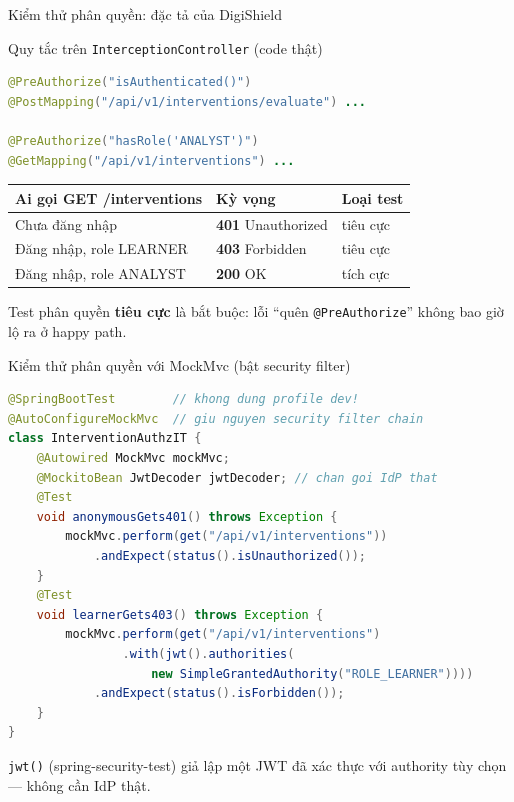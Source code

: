 \documentclass[aspectratio=169,12pt]{beamer}
\begin{document}
\begin{frame}[fragile]{Kiểm thử phân quyền: đặc tả của DigiShield}
  \begin{block}{Quy tắc trên \texttt{InterceptionController} (code thật)}
\begin{lstlisting}[language=Java,style=code]
@PreAuthorize("isAuthenticated()")
@PostMapping("/api/v1/interventions/evaluate") ...

@PreAuthorize("hasRole('ANALYST')")
@GetMapping("/api/v1/interventions") ...
\end{lstlisting}
  \end{block}
  \begin{center}
  \small
  \begin{tabular}{p{4.6cm}p{3.2cm}p{2.6cm}}
    \toprule
    \textbf{Ai gọi GET /interventions} & \textbf{Kỳ vọng} & \textbf{Loại test} \\
    \midrule
    Chưa đăng nhập      & \textbf{401} Unauthorized & tiêu cực \\
    Đăng nhập, role LEARNER & \textbf{403} Forbidden & tiêu cực \\
    Đăng nhập, role ANALYST & \textbf{200} OK        & tích cực \\
    \bottomrule
  \end{tabular}
  \end{center}
  \small Test phân quyền \textbf{tiêu cực} là bắt buộc: lỗi ``quên
  \texttt{@PreAuthorize}'' không bao giờ lộ ra ở happy path.
\end{frame}

\begin{frame}[fragile]{Kiểm thử phân quyền với MockMvc (bật security filter)}
\begin{lstlisting}[language=Java,style=codesm,basicstyle=\ttfamily\scriptsize]
@SpringBootTest        // khong dung profile dev!
@AutoConfigureMockMvc  // giu nguyen security filter chain
class InterventionAuthzIT {
    @Autowired MockMvc mockMvc;
    @MockitoBean JwtDecoder jwtDecoder; // chan goi IdP that
    @Test
    void anonymousGets401() throws Exception {
        mockMvc.perform(get("/api/v1/interventions"))
            .andExpect(status().isUnauthorized());
    }
    @Test
    void learnerGets403() throws Exception {
        mockMvc.perform(get("/api/v1/interventions")
                .with(jwt().authorities(
                    new SimpleGrantedAuthority("ROLE_LEARNER"))))
            .andExpect(status().isForbidden());
    }
}
\end{lstlisting}
  \small \texttt{jwt()} (spring-security-test) giả lập một JWT đã xác thực với
  authority tùy chọn --- không cần IdP thật.
\end{frame}
\end{document}
